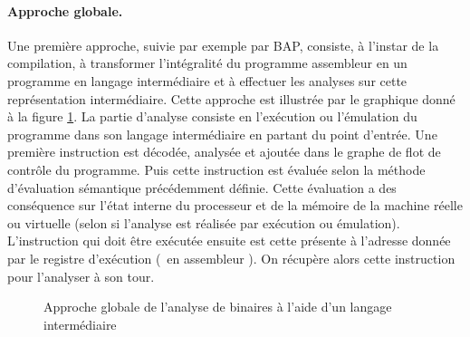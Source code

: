 \paragraph{Approche globale.}
Une première approche, suivie par exemple par BAP, consiste, à l'instar de la compilation, à transformer l'intégralité du programme assembleur en un programme en langage intermédiaire et à effectuer les analyses sur cette représentation intermédiaire.
Cette approche est illustrée par le graphique donné à la figure \ref{fig:diag_approche_globale}. La partie d'analyse consiste en l'exécution ou l'émulation du programme dans son langage intermédiaire en partant du point d'entrée.
Une première instruction est décodée, analysée et ajoutée dans le graphe de flot de contrôle du programme. Puis cette instruction est évaluée selon la méthode d'évaluation sémantique précédemment définie.
Cette évaluation a des conséquence sur l'état interne du processeur et de la mémoire de la machine réelle ou virtuelle (selon si l'analyse est réalisée par exécution ou émulation).
L'instruction qui doit être exécutée ensuite est cette présente à l'adresse donnée par le registre d'exécution (\eip\ en assembleur \xq). On récupère alors cette instruction pour l'analyser à son tour.

\begin{figure}
\begin{center}
\end{center}
\caption{Approche globale de l'analyse de binaires à l'aide d'un langage intermédiaire}
\label{fig:diag_approche_globale}
\end{figure}


